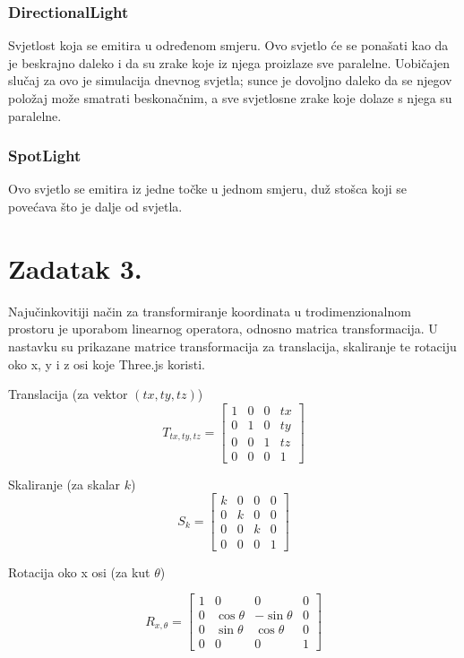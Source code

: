 \documentclass[a4paper,12pt]{article}
\begin{document}
\subsubsection*{DirectionalLight}
\hspace{10mm} Svjetlost koja se emitira u određenom smjeru. Ovo svjetlo će se ponašati kao da je beskrajno daleko i da su zrake koje iz njega proizlaze sve paralelne. Uobičajen slučaj za ovo je simulacija dnevnog svjetla; sunce je dovoljno daleko da se njegov položaj može smatrati beskonačnim, a sve svjetlosne zrake koje dolaze s njega su paralelne.

\subsubsection*{SpotLight}
\hspace{10mm} Ovo svjetlo se emitira iz jedne točke u jednom smjeru, duž stošca koji se povećava što je dalje od svjetla.

\pagebreak


\section*{Zadatak 3.}
Najučinkovitiji način za transformiranje koordinata u trodimenzionalnom prostoru je uporabom
linearnog operatora, odnosno matrica transformacija. U nastavku su prikazane matrice transformacija
za translacija, skaliranje te rotaciju oko x, y i z osi koje Three.js koristi.

Translacija (za vektor $(tx, ty, tz)$)
\[
T_{tx,ty,tz}=
\begin{bmatrix}
    1 & 0 & 0 & tx \\
    0 & 1 & 0 & ty \\
    0 & 0 & 1 & tz \\
    0 & 0 & 0 & 1
\end{bmatrix}
\]

Skaliranje (za skalar $k$)
\[
S_{k}=
\begin{bmatrix}
    k & 0 & 0 & 0 \\
    0 & k & 0 & 0 \\
    0 & 0 & k & 0 \\
    0 & 0 & 0 & 1
\end{bmatrix}
\]

Rotacija oko x osi (za kut $\theta$)

\[
R_{x,\theta}=
\begin{bmatrix}
    1 & 0 & 0 & 0 \\
    0 & \cos{\theta} & -\sin{\theta} & 0 \\
    0 & \sin{\theta} & \cos{\theta} & 0 \\
    0 & 0 & 0 & 1
\end{bmatrix}
\]
\end{document}
